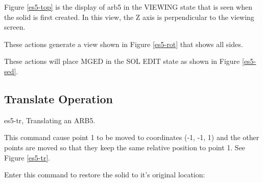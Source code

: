 
Figure \ref{es5-top} is the display of arb5
in the VIEWING state that is seen when
the solid is first created.
In this view, the Z axis is perpendicular to the viewing screen.


These actions generate a view shown in Figure \ref{es5-rot}
that shows all sides.


These actions will place MGED in the SOL EDIT state
as shown in Figure \ref{es5-sed}.

\subsection{Translate Operation}
\mfig es5-tr, Translating an ARB5.


This command cause point 1 to be moved to coordinates (-1, -1, 1) and the
other points are moved so that they keep the same relative position to point
1.  See Figure \ref{es5-tr}.

Enter this command to restore the solid to it's original location:


